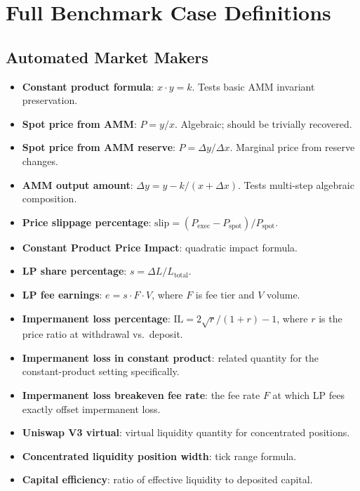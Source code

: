\documentclass[twoside,11pt]{article}
\begin{document}


\appendix

\section{Full Benchmark Case Definitions}\label{sec:benchmark_cases}
\label{app:cases}

\subsection{Automated Market Makers}\label{subsec:automated-market-makers}
\label{sec:bench_amm}

\begin{itemize}
  \item \textbf{Constant product formula}: $x \cdot y = k$.
    Tests basic AMM invariant preservation.
  \item \textbf{Spot price from AMM}: $P = y/x$.
    Algebraic; should be trivially recovered.
  \item \textbf{Spot price from AMM reserve}: $P = \Delta y / \Delta x$.
    Marginal price from reserve changes.
  \item \textbf{AMM output amount}: $\Delta y = y - k/(x + \Delta x)$.
    Tests multi-step algebraic composition.
  \item \textbf{Price slippage percentage}: $\mathrm{slip} = (P_{\mathrm{exec}} - P_{\mathrm{spot}})/P_{\mathrm{spot}}$.
  \item \textbf{Constant Product Price Impact}: quadratic impact formula.
  \item \textbf{LP share percentage}: $s = \Delta L / L_{\mathrm{total}}$.
  \item \textbf{LP fee earnings}: $e = s \cdot F \cdot V$, where $F$ is fee tier and $V$ volume.
  \item \textbf{Impermanent loss percentage}: $\mathrm{IL} = 2\sqrt{r}/(1+r) - 1$,
    where $r$ is the price ratio at withdrawal vs.\ deposit.
  \item \textbf{Impermanent loss in constant product}: related quantity for the
    constant-product setting specifically.
  \item \textbf{Impermanent loss breakeven fee rate}: the fee rate $F$ at which
    LP fees exactly offset impermanent loss.
  \item \textbf{Uniswap V3 virtual}: virtual liquidity quantity for
    concentrated positions.
  \item \textbf{Concentrated liquidity position width}: tick range formula.
  \item \textbf{Capital efficiency}: ratio of effective liquidity to deposited capital.
\end{itemize}
\end{document}

